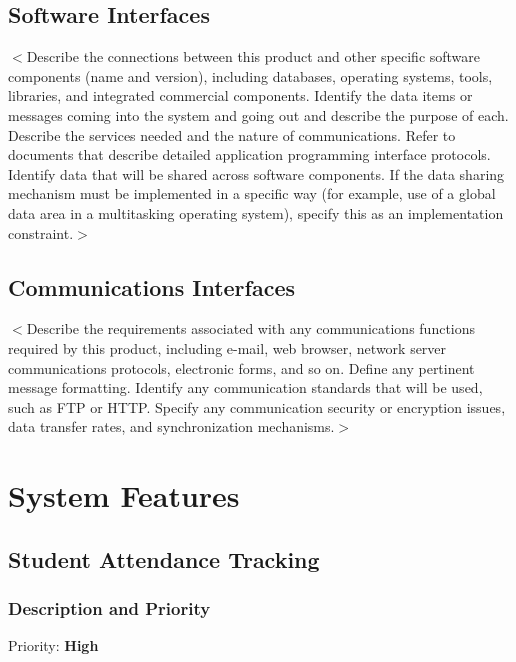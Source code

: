 \documentclass{scrreprt}
\begin{document}
\section{Software Interfaces}
$<$Describe the connections between this product and other specific software 
components (name and version), including databases, operating systems, tools, 
libraries, and integrated commercial components. Identify the data items or 
messages coming into the system and going out and describe the purpose of each.  
Describe the services needed and the nature of communications. Refer to 
documents that describe detailed application programming interface protocols.  
Identify data that will be shared across software components. If the data 
sharing mechanism must be implemented in a specific way (for example, use of a 
global data area in a multitasking operating system), specify this as an 
implementation constraint.$>$

\section{Communications Interfaces}
$<$Describe the requirements associated with any communications functions 
required by this product, including e-mail, web browser, network server 
communications protocols, electronic forms, and so on. Define any pertinent 
message formatting. Identify any communication standards that will be used, such 
as FTP or HTTP. Specify any communication security or encryption issues, data 
transfer rates, and synchronization mechanisms.$>$


\chapter{System Features}

\section{Student Attendance Tracking}


\subsection{Description and Priority}
Priority: \textbf{High}
\end{document}
